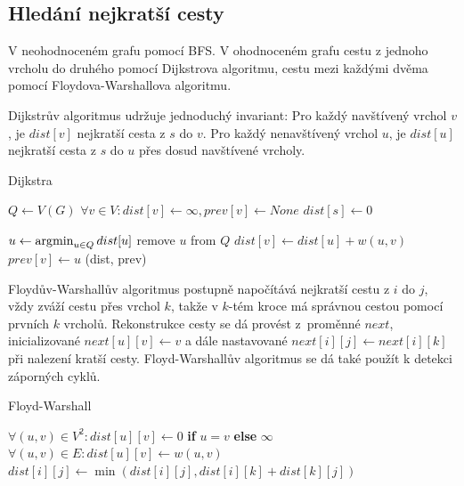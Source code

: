 \subsection{Hledání nejkratší cesty}

V neohodnoceném grafu pomocí BFS.
V ohodnoceném grafu cestu z jednoho vrcholu do druhého pomocí Dijkstrova
algoritmu, cestu mezi každými dvěma pomocí Floydova-Warshallova
algoritmu.

Dijkstrův algoritmus udržuje jednoduchý invariant:
Pro každý navštívený vrchol $v$, je $dist[v]$ nejkratší cesta z $s$ do
$v$. Pro každý nenavštívený vrchol $u$, je $dist[u]$ nejkratší cesta z
$s$ do $u$ přes dosud navštívené vrcholy.

\begin{algorithm}[h]
\caption{Dijkstra}
\begin{algorithmic}[1]
    \State $Q \gets V(G)$
    \State $\forall v \in V : dist[v] \gets \infty, prev[v] \gets None$
    \State $dist[s] \gets 0$

        \State $u \gets \operatorname*{\arg\!\min}_{u \in Q} dist[u]$
        \State remove $u$ from $Q$
                \State $dist[v] \gets dist[u] + w(u,v) $
                \State $prev[v] \gets u$
            \EndIf
        \EndFor
    \EndWhile
    \State \Return (dist, prev)
\EndFunction
\end{algorithmic}
\end{algorithm}

Floydův-Warshallův algoritmus postupně napočítává nejkratší cestu z $i$
do $j$, vždy zváží cestu přes vrchol $k$, takže v $k$-tém kroce
má správnou cestou pomocí prvních $k$ vrcholů.
Rekonstrukce cesty se dá provést z~proměnné $next$, inicializované
$next[u][v] \gets v$ a dále nastavované $next[i][j] \gets next[i][k]$
při nalezení kratší cesty.
Floyd-Warshallův algoritmus se dá také použít k detekci záporných cyklů.

\begin{algorithm}[H]
\caption{Floyd-Warshall}
\begin{algorithmic}[1]
    \State $\forall (u,v) \in V^2 : dist[u][v] \gets 0$
        \textbf{if} $u = v$ \textbf{else} $\infty$
    \State $\forall (u,v) \in E : dist[u][v] \gets w(u,v)$
                \State $dist[i][j] \gets \min(dist[i][j], dist[i][k] + dist[k][j])$
            \EndFor
        \EndFor
    \EndFor
\EndFunction
\end{algorithmic}
\end{algorithm}

